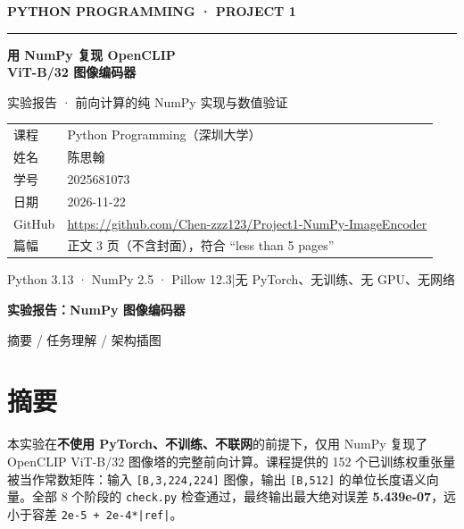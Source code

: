 \documentclass[11pt,a4paper]{article}
\newcommand{\code}[1]{\texttt{\small #1}}
\begin{document}
\begin{titlepage}
\centering
\vspace*{2.2cm}
{\large\bfseries\color{blue!55!black} PYTHON PROGRAMMING · PROJECT 1\par}
\vspace{0.5cm}
{\color{blue!55!black}\rule{\linewidth}{1.2pt}\par}
\vspace{1.4cm}
{\Huge\bfseries 用 NumPy 复现 OpenCLIP\\ ViT-B/32 图像编码器\par}
\vspace{0.8cm}
{\Large 实验报告 · 前向计算的纯 NumPy 实现与数值验证\par}
\vspace{2.2cm}
\begin{tabular}{l@{\quad}l}
课程 & Python Programming（深圳大学）\\
姓名 & 陈思翰\\
学号 & 2025681073\\
日期 & 2026-11-22\\
GitHub & \url{https://github.com/Chen-zzz123/Project1-NumPy-ImageEncoder}\\
篇幅 & 正文 3 页（不含封面），符合 ``less than 5 pages''\\
\end{tabular}
\vfill
{\small\color{gray} Python 3.13 · NumPy 2.5 · Pillow 12.3\quad|\quad 无 PyTorch、无训练、无 GPU、无网络\par}
\vspace{0.4cm}
\end{titlepage}

{\Large\bfseries 实验报告：NumPy 图像编码器\par}
{\small\color{gray} 摘要 / 任务理解 / 架构插图\par}
\vspace{4pt}

\section*{摘要}
本实验在\textbf{不使用 PyTorch、不训练、不联网}的前提下，仅用 NumPy 复现了 OpenCLIP ViT-B/32 图像塔的完整前向计算。课程提供的 152 个已训练权重张量被当作常数矩阵：输入 \code{[B,3,224,224]} 图像，输出 \code{[B,512]} 的单位长度语义向量。全部 8 个阶段的 \code{check.py} 检查通过，最终输出最大绝对误差 \textbf{5.439e-07}，远小于容差 \code{2e-5 + 2e-4*|ref|}。
\end{document}
